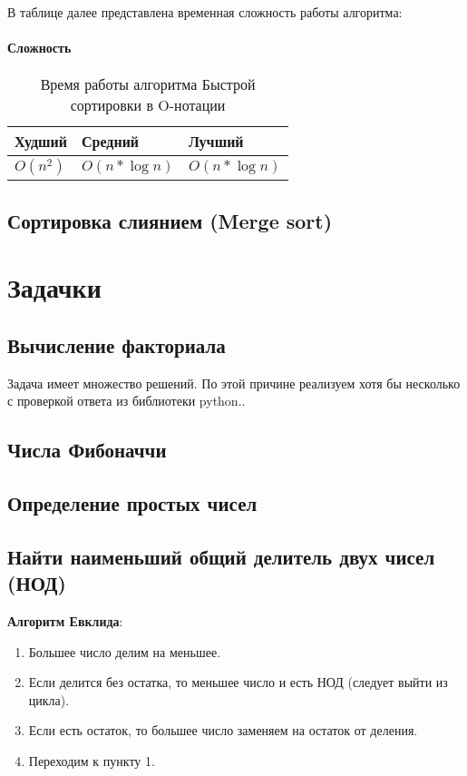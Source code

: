 В таблице далее представлена временная сложность работы алгоритма:

\subsubsection{Сложность}
\begin{table}[h!]
\caption{Время работы алгоритма Быстрой сортировки в O-нотации}
\begin{tabular}{|l|l|l|}
\hline
Худший & Средний & Лучший \\ \hline
$ O(n^{2}) $ & $ O(n*\log n) $ & $ O(n*\log n) $ \\\hline
\end{tabular}
\end{table}

\section{Сортировка слиянием (Merge sort)}

\linenumbers
{}
\nolinenumbers

\chapter{Задачки}

\section{Вычисление факториала \label{tasks:fac}}
Задача имеет множество решений. По этой причине реализуем хотя бы несколько с проверкой ответа из библиотеки python..

\linenumbers
{}
\nolinenumbers

\section{Числа Фибоначчи \label{tasks:fib}}

\section{Определение простых чисел \label{tasks:simple} }

\linenumbers
{}
\nolinenumbers

\section{Найти наименьший общий делитель двух чисел (НОД)}
\textbf{Алгоритм Евклида}:
\begin{enumerate}
\item Большее число делим на меньшее.
\item Если делится без остатка, то меньшее число и есть НОД (следует выйти из цикла).
\item Если есть остаток, то большее число заменяем на остаток от деления.
\item Переходим к пункту 1.

\end{enumerate}

